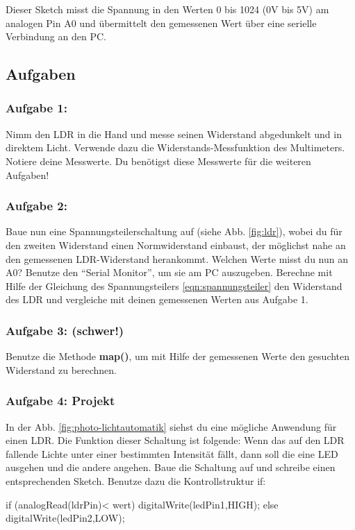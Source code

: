 Dieser Sketch misst die Spannung in den Werten 0 bis 1024 (0V bis 5V) am analogen Pin A0 und übermittelt den gemessenen Wert über eine serielle Verbindung an den PC. 


\subsection{Aufgaben}

\subsubsection{Aufgabe 1:} Nimm den LDR in die Hand und messe seinen Widerstand abgedunkelt und in direktem Licht. Verwende dazu die Widerstands-Messfunktion des Multimeters. Notiere deine Messwerte. Du benötigst diese Messwerte für die weiteren Aufgaben!
\subsubsection{Aufgabe 2:}  
Baue nun eine Spannungsteilerschaltung auf (siehe Abb. \ref{fig:ldr}), wobei du für den zweiten Widerstand einen Normwiderstand einbaust, der möglichst nahe an den gemessenen LDR-Widerstand herankommt. Welchen Werte misst du nun an A0? Benutze den ``Serial Monitor'', um sie am PC auszugeben. Berechne mit Hilfe der Gleichung des Spannungsteilers \ref{eqn:spannungsteiler} den Widerstand des LDR und vergleiche mit deinen gemessenen Werten aus Aufgabe 1. 

\subsubsection{Aufgabe 3: (schwer!)} Benutze die Methode \textbf{map()}, um mit Hilfe der gemessenen Werte den gesuchten Widerstand zu berechnen. 


\subsubsection{Aufgabe 4: Projekt}

In der Abb. \ref{fig:photo-lichtautomatik} siehst du eine mögliche Anwendung für einen LDR. Die Funktion dieser Schaltung ist folgende: Wenn das auf den LDR fallende Lichte unter einer bestimmten Intensität fällt, dann soll die eine LED ausgehen und die andere angehen. Baue die Schaltung auf und schreibe einen entsprechenden Sketch. Benutze dazu die Kontrollstruktur if:
\begin{arduinoCode}{}{}
if (analogRead(ldrPin)< wert) {
  digitalWrite(ledPin1,HIGH);
} 
else {
  digitalWrite(ledPin2,LOW);
}
\end{arduinoCode}


